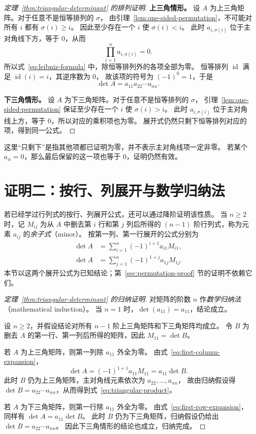 \documentclass[UTF8,12pt,a4paper,fontset=fandol]{ctexart}
\begin{document}
\begin{proof}[定理~\ref{thm:triangular-determinant} 的排列证明]
\textbf{上三角情形。}
设 $A$ 为上三角矩阵。对于任意不是恒等排列的 $\sigma$，
由引理~\ref{lem:one-sided-permutation}，不可能对所有 $i$ 都有 $\sigma(i)\geq i$。
因此至少存在一个 $i$ 使 $\sigma(i)<i$。
此时 $a_{i,\sigma(i)}$ 位于主对角线下方，等于 $0$，从而
\[
  \prod_{i=1}^{n}a_{i,\sigma(i)}=0.
\]
所以式~\eqref{eq:leibniz-formula} 中，除恒等排列外的各项全部为零。
恒等排列 $\operatorname{id}$ 满足 $\operatorname{id}(i)=i$，其逆序数为 $0$，
故该项的符号为 $(-1)^0=1$，于是
\[
  \det A=a_{11}a_{22}\cdots a_{nn}.
\]

\textbf{下三角情形。}
设 $A$ 为下三角矩阵。对于任意不是恒等排列的 $\sigma$，
引理~\ref{lem:one-sided-permutation} 保证至少存在一个 $i$ 使 $\sigma(i)>i$。
此时 $a_{i,\sigma(i)}$ 位于主对角线上方，等于 $0$，所以对应的乘积项也为零。
展开式仍然只剩下恒等排列对应的项，得到同一公式。
\end{proof}

这里“只剩下”是指其他项都已证明为零，并不表示主对角线项一定非零。
若某个 $a_{ii}=0$，那么最后保留的这一项也等于 $0$，证明仍然有效。

\section{证明二：按行、列展开与数学归纳法}

若已经学过行列式的按行、列展开公式，还可以通过降阶证明该性质。
当 $n\geq2$ 时，记 $M_{ij}$ 为从 $A$ 中删去第 $i$ 行和第 $j$ 列后所得的
$(n-1)$ 阶行列式，称为元素 $a_{ij}$ 的\emph{余子式}（minor）。
按第一列、第一行展开的公式分别为
\begin{align}
  \det A&=\sum_{i=1}^{n}(-1)^{i+1}a_{i1}M_{i1},
  \label{eq:first-column-expansion}\\
  \det A&=\sum_{j=1}^{n}(-1)^{1+j}a_{1j}M_{1j}.
  \label{eq:first-row-expansion}
\end{align}
本节以这两个展开公式为已知结论；第~\ref{sec:permutation-proof} 节的证明不依赖它们。

\begin{proof}[定理~\ref{thm:triangular-determinant} 的归纳证明]
对矩阵的阶数 $n$ 作\emph{数学归纳法}（mathematical induction）。
当 $n=1$ 时，$\det(a_{11})=a_{11}$，结论成立。

设 $n\geq2$，并假设结论对所有 $n-1$ 阶上三角矩阵和下三角矩阵均成立。
令 $B$ 为删去 $A$ 的第一行、第一列后所得的矩阵，因此 $M_{11}=\det B$。

若 $A$ 为上三角矩阵，则第一列除 $a_{11}$ 外全为零。
由式~\eqref{eq:first-column-expansion}，
\[
  \det A=(-1)^{1+1}a_{11}M_{11}=a_{11}\det B.
\]
此时 $B$ 仍为上三角矩阵，主对角线元素依次为 $a_{22},\ldots,a_{nn}$，
故由归纳假设得 $\det B=a_{22}\cdots a_{nn}$，从而得到式~\eqref{eq:triangular-product}。

若 $A$ 为下三角矩阵，则第一行除 $a_{11}$ 外全为零。
由式~\eqref{eq:first-row-expansion}，同样有 $\det A=a_{11}\det B$。
此时 $B$ 仍为下三角矩阵，归纳假设仍给出 $\det B=a_{22}\cdots a_{nn}$。
因此下三角情形的结论也成立，归纳完成。
\end{proof}
\end{document}
